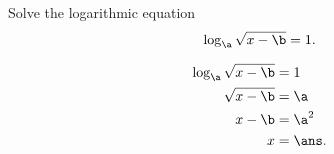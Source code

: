 






Solve the logarithmic equation 
\[\log_{\a} \sqrt{x-\b}=1.\]


\begin{solution}
		\[\begin{split}
		\log_{\a} \sqrt{x-\b}&=1\\
		\sqrt{x-\b}&=\a\\
		x-\b&=\a^2\\
		 x &=\ans.
		\end{split}
		\]
\end{solution}
